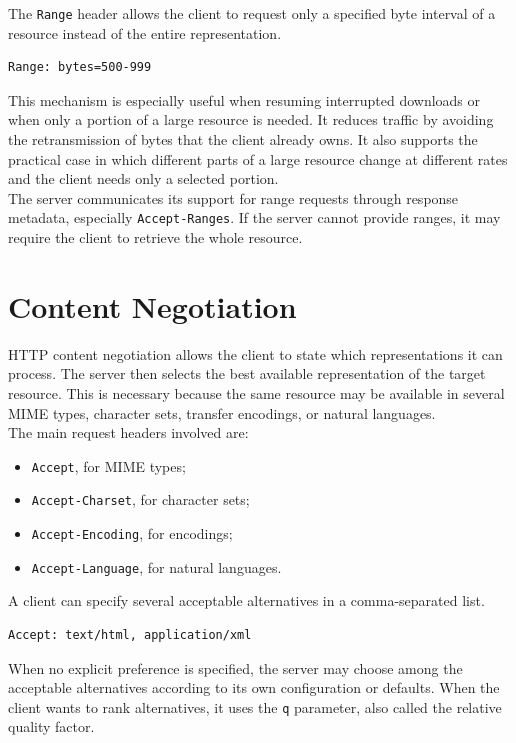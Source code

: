 \documentclass{scrbook}
\begin{document}
The \texttt{Range} header allows the client to request only a specified byte interval of a resource instead of the entire representation.

\begin{lstlisting}
Range: bytes=500-999
\end{lstlisting}

This mechanism is especially useful when resuming interrupted downloads or when only a portion of a large resource is needed. It reduces traffic by avoiding the retransmission of bytes that the client already owns. It also supports the practical case in which different parts of a large resource change at different rates and the client needs only a selected portion.\\

The server communicates its support for range requests through response metadata, especially \texttt{Accept-Ranges}. If the server cannot provide ranges, it may require the client to retrieve the whole resource.

\section{Content Negotiation}

HTTP content negotiation allows the client to state which representations it can process. The server then selects the best available representation of the target resource. This is necessary because the same resource may be available in several MIME types, character sets, transfer encodings, or natural languages.\\

The main request headers involved are:
\begin{itemize}
    \item \texttt{Accept}, for MIME types;
    \item \texttt{Accept-Charset}, for character sets;
    \item \texttt{Accept-Encoding}, for encodings;
    \item \texttt{Accept-Language}, for natural languages.
\end{itemize}

A client can specify several acceptable alternatives in a comma-separated list.

\begin{lstlisting}
Accept: text/html, application/xml
\end{lstlisting}

When no explicit preference is specified, the server may choose among the acceptable alternatives according to its own configuration or defaults. When the client wants to rank alternatives, it uses the \texttt{q} parameter, also called the relative quality factor.
\end{document}
